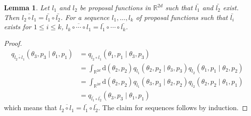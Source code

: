\documentclass[english,twoside,openright]{HYgraduMLDS}
\newtheorem{lemma}{Lemma}
\newcommand{\R}{\mathbb{R}}
\newcommand{\dx}{\mathrm{d}}
\begin{document}
\begin{lemma}\label{prop_fun_comp_lemma}
  Let \(l_{1}\) and \(l_{2}\) be proposal functions in \(\R^{2d}\) such that
  \(\bar{l_{1}}\) and \(\bar{l_{2}}\) exist.
  Then \(\overline{l_{2} \circ l_{1}} = \bar{l_{1}}\circ \bar{l_{2}}\).
  For a sequence \(l_{1}, \dotsc, l_{k}\) of proposal functions such that
  \(\bar{l_{i}}\) exists for \(1\leq i \leq k\),
  \(\overline{l_{k}\circ \dotsb \circ l_{1}} = \bar{l_{1}}\circ \dotsb \circ \bar{l_{k}}\).
\end{lemma}
\begin{proof}
  \begin{align*}
	q_{\overline{l_{2}\circ l_{1}}}(\theta_{3}, p_{3}\mid \theta_{1}, p_{1})
    &= q_{l_{2}\circ l_{1}}(\theta_{1}, p_{1}\mid \theta_{3}, p_{3})
    \\&= \int_{\R^{2d}} \dx(\theta_{2}, p_{2}) q_{l_{1}}(\theta_{2}, p_{2}\mid \theta_{3}, p_{3})
      q_{l_{2}}(\theta_{1}, p_{1}\mid \theta_{2}, p_{2})
    \\&= \int_{\R^{2d}} \dx(\theta_{2}, p_{2}) q_{\bar{l}_{1}}(\theta_{3}, p_{3}\mid \theta_{2}, p_{2})
      q_{\bar{l}_{2}}(\theta_{2}, p_{2}\mid \theta_{1}, p_{1})
    \\&= q_{\bar{l_{1}}\circ \bar{l_{2}}}(\theta_{3}, p_{3}\mid \theta_{1}, p_{1})
  \end{align*}
  which means that \(\overline{l_{2} \circ l_{1}} = \bar{l_{1}}\circ \bar{l_{2}}\).
  The claim for sequences follows by induction.
\end{proof}
\end{document}

